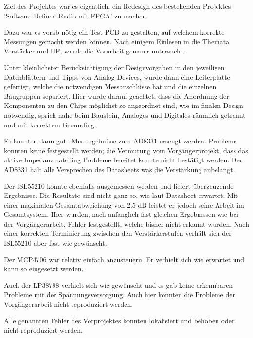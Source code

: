Ziel des Projektes war es eigentlich, ein Redesign des bestehenden Projektes 'Software Defined Radio mit FPGA' zu machen.

Dazu war es vorab nötig ein Test-PCB zu gestalten, auf welchem korrekte Messungen gemacht werden können.
Nach einigem Einlesen in die Themata Verstärker und HF, wurde die Vorarbeit genauer untersucht.

Unter kleinlichster Berücksichtigung der Designvorgaben in den jeweiligen Datenblättern und Tipps von Analog Devices\cite{StayingWellGrounded2012}, wurde dann eine Leiterplatte gefertigt, welche die notwendigen Messanschlüsse hat und die einzelnen Baugruppen separiert. Hier wurde darauf geachtet, dass die Anordnung der Komponenten zu den Chips möglichst so angeordnet sind, wie im finalen Design notwendig, sprich nahe beim Baustein, Analoges und Digitales räumlich getrennt und mit korrektem Grounding.

Es konnten dann gute Messergebnisse zum AD8331 erzeugt werden. Probleme konnten keine festgestellt werden; die Vermutung vom Vorgängerprojekt, dass das aktive Impedanzmatching Probleme bereitet konnte nicht bestätigt werden. Der AD8331 hält alle Versprechen des Datasheets was die Verstärkung anbelangt.

Der ISL55210 konnte ebenfalls ausgemessen werden und liefert überzeugende Ergebnisse. Die Resultate sind nicht ganz so, wie laut Datasheet erwartet. Mit einer maximalen Gesamtabweichung von 2.5 dB leistet er jedoch seine Arbeit im Gesamtsystem. Hier wurden, nach anfänglich fast gleichen Ergebnissen wie bei der Vorgängerarbeit, Fehler festgestellt, welche bisher nicht erkannt wurden. Nach einer korrekten Terminierung zwischen den Verstärkerstufen verhält sich der ISL55210 aber fast wie gewünscht.

Der MCP4706 war relativ einfach anzusteuern. Er verhielt sich wie erwartet und kann so eingesetzt werden.

Auch der LP38798 verhielt sich wie gewünscht und es gab keine erkennbaren Probleme mit der Spannungsversorgung. Auch hier konnten die Probleme der Vorgängerarbeit nicht reproduziert werden.

Alle genannten Fehler des Vorprojektes konnten lokalisiert und behoben oder nicht reproduziert werden.